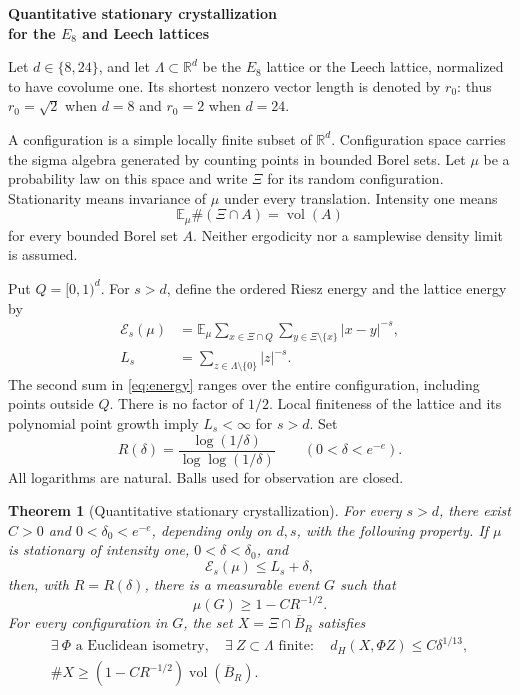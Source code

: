 \documentclass[a4paper,11pt]{article}
\makeatletter
\renewcommand\section{\@startsection{section}{1}{0pt}{18pt}{9pt}{\normalfont\fontsize{14.5}{18}\bfseries}}
\newtheorem{theorem}{Theorem}[section]
\theoremstyle{remark}
\numberwithin{equation}{section}
\newcommand{\R}{\mathbb R}
\newcommand{\E}{\mathbb E}
\newcommand{\calE}{\mathcal E}
\newcommand{\vol}{\operatorname{vol}}
\newcommand{\BR}{\overline B_R}
\makeatother
\begin{document}
\begin{center}
{\fontsize{20}{23}\selectfont\bfseries Quantitative stationary crystallization\\for the $E_8$ and Leech lattices}
\end{center}
\vspace{3pt}

\section{Statement and conventions}
Let $d\in\{8,24\}$, and let $\Lambda\subset\R^d$ be the $E_8$ lattice or the Leech lattice, normalized to have covolume one. Its shortest nonzero vector length is denoted by $r_0$: thus $r_0=\sqrt2$ when $d=8$ and $r_0=2$ when $d=24$.

A configuration is a simple locally finite subset of $\R^d$. Configuration space carries the sigma algebra generated by counting points in bounded Borel sets. Let $\mu$ be a probability law on this space and write $\Xi$ for its random configuration. Stationarity means invariance of $\mu$ under every translation. Intensity one means
\[
\E_\mu\#(\Xi\cap A)=\vol(A)
\]
for every bounded Borel set $A$. Neither ergodicity nor a samplewise density limit is assumed.

Put $Q=[0,1)^d$. For $s>d$, define the ordered Riesz energy and the lattice energy by
\begin{align}
\calE_s(\mu)&=\E_\mu\sum_{x\in\Xi\cap Q}\sum_{y\in\Xi\setminus\{x\}}|x-y|^{-s},\label{eq:energy}\\
L_s&=\sum_{z\in\Lambda\setminus\{0\}}|z|^{-s}.\label{eq:lattice}
\end{align}
The second sum in \eqref{eq:energy} ranges over the entire configuration, including points outside $Q$. There is no factor of $1/2$. Local finiteness of the lattice and its polynomial point growth imply $L_s<\infty$ for $s>d$. Set
\begin{equation}
R(\delta)=\frac{\log(1/\delta)}{\log\log(1/\delta)}\qquad(0<\delta<e^{-e}).\label{eq:radius}
\end{equation}
All logarithms are natural. Balls used for observation are closed.

\begin{theorem}[Quantitative stationary crystallization]\label{thm:main}
For every $s>d$, there exist $C>0$ and $0<\delta_0<e^{-e}$, depending only on $d,s$, with the following property. If $\mu$ is stationary of intensity one, $0<\delta<\delta_0$, and
\[
\calE_s(\mu)\le L_s+\delta,
\]
then, with $R=R(\delta)$, there is a measurable event $G$ such that
\[
\mu(G)\ge1-CR^{-1/2}.
\]
For every configuration in $G$, the set $X=\Xi\cap\BR$ satisfies
\begin{gather}
\exists\ \Phi\text{ a Euclidean isometry},\quad
\exists\ Z\subset\Lambda\text{ finite}:\quad
d_H(X,\Phi Z)\le C\delta^{1/13},\label{eq:match}\\
\#X\ge(1-CR^{-1/2})\vol(\BR).\label{eq:count}
\end{gather}
\end{theorem}
\end{document}
